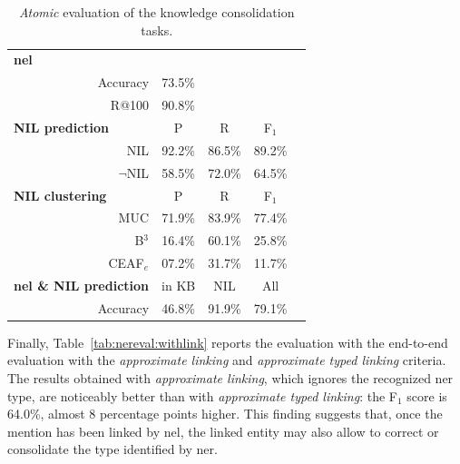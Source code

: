 \begin{table}[H]
    \centering
    \begin{tabular}{r|cccc}
        \multicolumn{1}{l|}{\textbf{\ac{nel}}} & & & & \\
        Accuracy & 73.5\% & & & \\
        R@100 & 90.8\% & & & \\
        \midrule
        \multicolumn{1}{l|}{\textbf{NIL prediction}} & P & R & F$_1$ \\
        NIL & 92.2\% & 86.5\% & 89.2\% \\
        $\neg$NIL & 58.5\% & 72.0\% & 64.5\% \\
        \midrule
        \multicolumn{1}{l|}{\textbf{NIL clustering}} & P & R & F$_1$ \\
        MUC & 71.9\% & 83.9\% & 77.4\% \\
        B$^{3}$ & 16.4\% & 60.1\% & 25.8\% \\
        CEAF$_{e}$ & 07.2\% & 31.7\% & 11.7\% \\
        \midrule
        \multicolumn{1}{l|}{\textbf{\ac{nel} \& NIL prediction}} & in KB & NIL & All \\
        Accuracy & 46.8\% & 91.9\% & 79.1\% \\
    \end{tabular}
    \caption{\textit{Atomic} evaluation of the knowledge consolidation tasks.}
    \label{tab:nereval:atomic}
\end{table}

Finally, Table~\ref{tab:nereval:withlink} reports the evaluation with the end-to-end evaluation with the \textit{approximate linking} and \textit{approximate typed linking} criteria. The results obtained with \textit{approximate linking}, which ignores the recognized \ac{ner} type, are noticeably better than with \textit{approximate typed linking}: the F$_1$ score is 64.0\%, almost 8 percentage points higher. This finding suggests that, once the mention has been linked by \ac{nel}, the linked entity may also allow to correct or consolidate the type identified by \ac{ner}.


